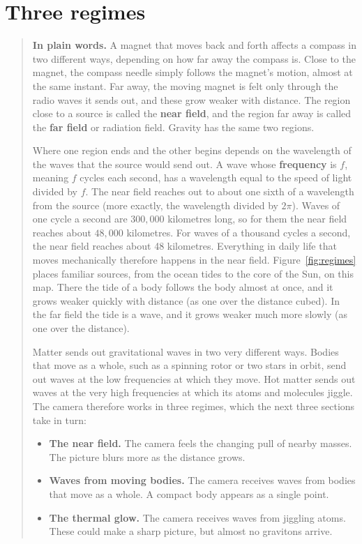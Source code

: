 \section{Three regimes}\label{sec:regimes}

\begin{quote}
\textbf{In plain words.} A magnet that moves back and forth affects a compass
in two different ways, depending on how far away the compass is. Close to the
magnet, the compass needle simply follows the magnet's motion, almost at the
same instant. Far away, the moving magnet is felt only through the radio waves
it sends out, and these grow weaker with distance. The region close to a source
is called the \textbf{near field}, and the region far away is called the
\textbf{far field} or radiation field. Gravity has the same two regions.

Where one region ends and the other begins depends on the wavelength of the
waves that the source would send out. A wave whose \textbf{frequency} is $f$,
meaning $f$ cycles each second, has a wavelength equal to the speed of light
divided by $f$. The near field reaches out to about one sixth of a wavelength
from the source (more exactly, the wavelength divided by $2\pi$). Waves of one
cycle a second are $300{,}000$ kilometres long, so for them the near field
reaches about $48{,}000$ kilometres. For waves of a thousand cycles a second,
the near field reaches about 48 kilometres. Everything in daily life that moves mechanically therefore happens in the
near field. Figure~\ref{fig:regimes} places familiar sources, from the ocean tides to the core of the Sun, on this map. There the tide of a body follows the body almost at once, and it
grows weaker quickly with distance (as one over the distance cubed). In the far
field the tide is a wave, and it grows weaker much more slowly (as one over the
distance).

Matter sends out gravitational waves in two very different ways. Bodies that
move as a whole, such as a spinning rotor or two stars in orbit, send out waves
at the low frequencies at which they move. Hot matter sends out waves at the
very high frequencies at which its atoms and molecules jiggle. The camera
therefore works in three regimes, which the next three sections take in turn:
\begin{itemize}
\item \textbf{The near field.} The camera feels the changing pull of nearby
masses. The picture blurs more as the distance grows.
\item \textbf{Waves from moving bodies.} The camera receives waves from bodies
that move as a whole. A compact body appears as a single point.
\item \textbf{The thermal glow.} The camera receives waves from jiggling atoms.
These could make a sharp picture, but almost no gravitons arrive.
\end{itemize}


\end{quote}
